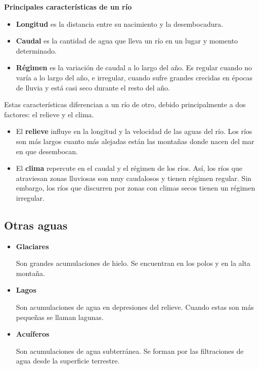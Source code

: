 \textbf{Principales características de un río}

\begin{itemize}
    \item \textbf{Longitud} es la distancia entre su nacimiento y la desembocadura.
    \item \textbf{Caudal} es la cantidad de agua que lleva un río en un lugar y momento determinado.
    \item \textbf{Régimen} es la variación de caudal a lo largo del año. Es regular cuando no varía a lo largo del año, e irregular, cuando sufre grandes crecidas en épocas de lluvia y está casi seco durante el resto del año.
\end{itemize}
Estas características diferencian a un río de otro, debido principalmente a dos factores: el relieve y el clima.
\begin{itemize}
    \item El \textbf{relieve} influye en la longitud y la velocidad de las aguas del río. Los ríos son más largos cuanto más alejadas están las montañas donde nacen del mar en que desembocan.
    \item El \textbf{clima} repercute en el caudal y el régimen de los ríos. Así, los ríos que atraviesan zonas lluviosas son muy caudalosos y tienen régimen regular. Sin embargo, los ríos que discurren por zonas con climas secos tienen un régimen irregular.
\end{itemize}

\subsection{Otras aguas}

\begin{itemize}
    \item \textbf{Glaciares}

    Son grandes acumulaciones de hielo. Se encuentran en los polos y en la alta montaña.
    \item \textbf{Lagos}
    
    Son acumulaciones de agua en depresiones del relieve. Cuando estas son más pequeñas se llaman lagunas.
    \item \textbf{Acuíferos}

    Son acumulaciones de agua subterránea. Se forman por las filtraciones de agua desde la superficie terrestre.
\end{itemize}
